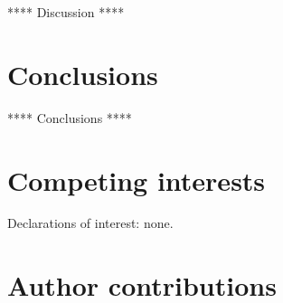 \documentclass[12pt]{article}\usepackage[]{graphicx}\usepackage[]{xcolor}
\begin{document}
**** Discussion ****


\section{Conclusions}
\label{sec:conclusion}

**** Conclusions ****


\section*{Competing interests}
\label{sec:competing_interests}

Declarations of interest: none.


\clearpage


\section*{Author contributions}
\label{sec:author_contributions}
\end{document}

